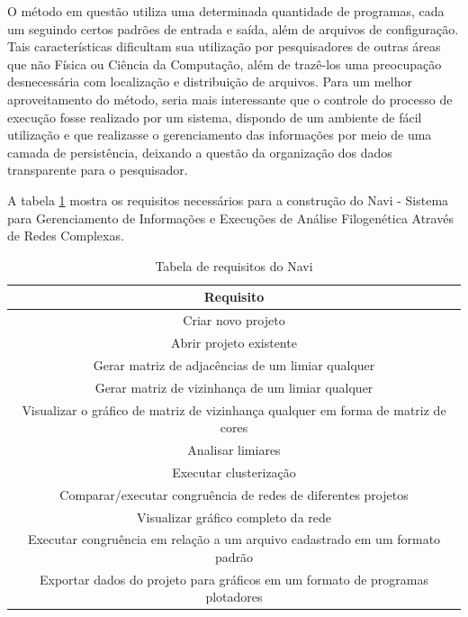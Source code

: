 O método em questão utiliza uma determinada quantidade de programas, cada um seguindo certos padrões de entrada e saída, além de arquivos de configuração.
Tais características dificultam sua utilização por pesquisadores de outras áreas que não Física ou Ciência da Computação, além de trazê-los uma preocupação
desnecessária com localização e distribuição de arquivos. Para um melhor aproveitamento do método, seria mais interessante que o controle do processo de
execução fosse realizado por um sistema, dispondo de um ambiente de fácil utilização e que realizasse o gerenciamento das informações por meio de uma camada
de persistência, deixando a questão da organização dos dados transparente para o pesquisador.

A tabela \ref{tab:requisitos} mostra os requisitos necessários para a construção do Navi - Sistema para Gerenciamento de Informações e Execuções de Análise
Filogenética Através de Redes Complexas.

\begin{table}
\centering
\caption{Tabela de requisitos do Navi} %
\begin{tabular}{c} %
\hline 
Requisito \\ 
\hline
\hline
Criar novo projeto \\
Abrir projeto existente \\
Gerar matriz de adjacências de um limiar qualquer \\
Gerar matriz de vizinhança de um limiar qualquer \\
Visualizar o gráfico de matriz de vizinhança qualquer em forma de matriz de cores \\
Analisar limiares \\
Executar clusterização \\
Comparar/executar congruência de redes de diferentes projetos \\
Visualizar gráfico completo da rede \\
Executar congruência em relação a um arquivo cadastrado em um formato padrão \\
Exportar dados do projeto para gráficos em um formato de programas plotadores \\
\hline
\end{tabular}
\label{tab:requisitos}
\end{table} 

